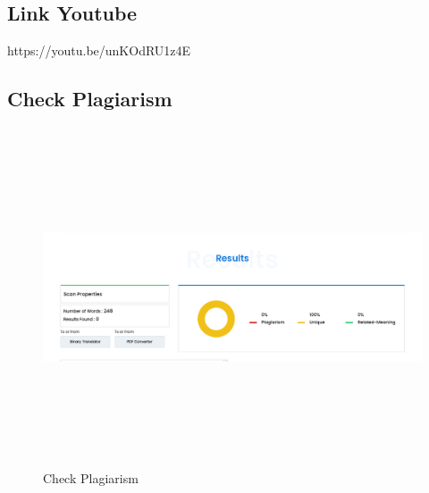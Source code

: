 \subsection {Link Youtube}
https://youtu.be/unKOdRU1z4E
\subsection {Check Plagiarism}
\begin{figure}
\centering
\includegraphics[width=15cm,height=10cm]{figures/Tugas1/1174071/Plagiarism.png}
\caption{Check Plagiarism}
\end{figure}